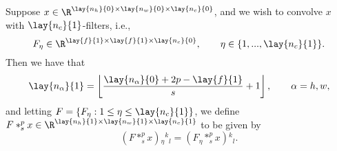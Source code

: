 Suppose $x\in\R^{\lay{n_h}{0}\times\lay{n_w}{0}\times\lay{n_c}{0}}$, and we wish to convolve $x$ with $\lay{n_c}{1}$-filters, i.e.,
$$F_\eta\in\R^{\lay{f}{1}\times\lay{f}{1}\times\lay{n_c}{0}},\qquad\eta\in\{1,...,\lay{n_c}{1}\}.$$
Then we have that 
$$\lay{n_\alpha}{1}=\left\lfloor\frac{\lay{n_\alpha}{0}+2p-\lay{f}{1}}{s}+1\right\rfloor,\qquad \alpha=h,w,$$
and letting $F=\{F_\eta:1\leq\eta\leq\lay{n_c}{1}\}$, we define $F*^p_sx\in\R^{\lay{n_h}{1}\times\lay{n_w}{1}\times\lay{n_c}{1}}$ to be given by
$$(F*^p_sx){_\eta}{^k}{_l}=(F_\eta*^p_sx){^k}{_l}.$$

















